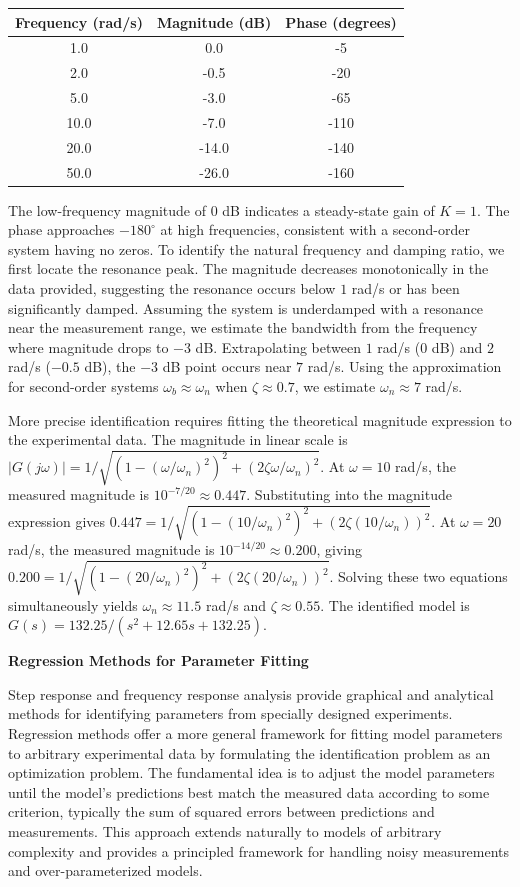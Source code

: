 \begin{table}[htbp]
\centering
\begin{tabular}{|c|c|c|}
\hline
Frequency (rad/s) & Magnitude (dB) & Phase (degrees) \\
\hline
1.0 & 0.0 & -5 \\
\hline
2.0 & -0.5 & -20 \\
\hline
5.0 & -3.0 & -65 \\
\hline
10.0 & -7.0 & -110 \\
\hline
20.0 & -14.0 & -140 \\
\hline
50.0 & -26.0 & -160 \\
\hline
\end{tabular}
\label{tab:frequency_data}
\end{table}

The low-frequency magnitude of $0$ dB indicates a steady-state gain of $K = 1$. The phase approaches $-180^\circ$ at high frequencies, consistent with a second-order system having no zeros. To identify the natural frequency and damping ratio, we first locate the resonance peak. The magnitude decreases monotonically in the data provided, suggesting the resonance occurs below $1$ rad/s or has been significantly damped. Assuming the system is underdamped with a resonance near the measurement range, we estimate the bandwidth from the frequency where magnitude drops to $-3$ dB. Extrapolating between $1$ rad/s ($0$ dB) and $2$ rad/s ($-0.5$ dB), the $-3$ dB point occurs near $7$ rad/s. Using the approximation for second-order systems $\omega_b \approx \omega_n$ when $\zeta \approx 0.7$, we estimate $\omega_n \approx 7$ rad/s.

More precise identification requires fitting the theoretical magnitude expression to the experimental data. The magnitude in linear scale is $|G(j\omega)| = 1/\sqrt{(1 - (\omega/\omega_n)^2)^2 + (2\zeta\omega/\omega_n)^2}$. At $\omega = 10$ rad/s, the measured magnitude is $10^{-7/20} \approx 0.447$. Substituting into the magnitude expression gives $0.447 = 1/\sqrt{(1 - (10/\omega_n)^2)^2 + (2\zeta(10/\omega_n))^2}$. At $\omega = 20$ rad/s, the measured magnitude is $10^{-14/20} \approx 0.200$, giving $0.200 = 1/\sqrt{(1 - (20/\omega_n)^2)^2 + (2\zeta(20/\omega_n))^2}$. Solving these two equations simultaneously yields $\omega_n \approx 11.5$ rad/s and $\zeta \approx 0.55$. The identified model is $G(s) = 132.25/(s^2 + 12.65s + 132.25)$.

\textbf{Regression Methods for Parameter Fitting}

Step response and frequency response analysis provide graphical and analytical methods for identifying parameters from specially designed experiments. Regression methods offer a more general framework for fitting model parameters to arbitrary experimental data by formulating the identification problem as an optimization problem. The fundamental idea is to adjust the model parameters until the model's predictions best match the measured data according to some criterion, typically the sum of squared errors between predictions and measurements. This approach extends naturally to models of arbitrary complexity and provides a principled framework for handling noisy measurements and over-parameterized models.

